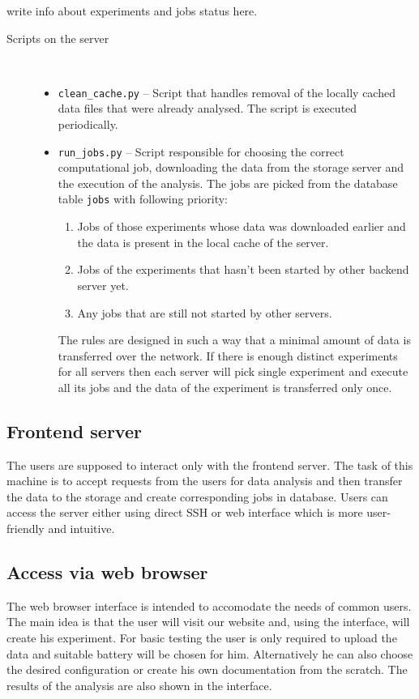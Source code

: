 \documentclass[
  digital,  	%
  color,		%
  oneside,   	%
  12pt,
  nocover,
  notable,
  nolof,
  nolot,
]{fithesis3}
\newenvironment{titlemize}[1]
{
	\begin{description}
	\item[#1]\
	\begin{itemize}
}
{
	\end{itemize}
 	\end{description}
}
\begin{document}
\begin{huge}
write info about experiments and jobs status here.
\end{huge}

\begin{titlemize}{Scripts on the server}
\item \texttt{clean\_cache.py} -- Script that handles removal of the locally cached data files that were already analysed. The script is executed periodically.
\item \texttt{run\_jobs.py} -- Script responsible for choosing the correct computational job, downloading the data from the storage server and the execution of the analysis. The jobs are picked from the database table \texttt{jobs} with following priority:
\begin{enumerate}
\item Jobs of those experiments whose data was downloaded earlier and the data is present in the local cache of the server.
\item Jobs of the experiments that hasn't been started by other backend server yet.
\item Any jobs that are still not started by other servers.
\end{enumerate}
The rules are designed in such a way that a minimal amount of data is transferred over the network. If there is enough distinct experiments for all servers then each server will pick single experiment and execute all its jobs and the data of the experiment is transferred only once.
\end{titlemize}

\subsection{Frontend server}
The users are supposed to interact only with the frontend server. The task of this machine is to accept requests from the users for data analysis and then transfer the data to the storage and create corresponding jobs in database. Users can access the server either using direct SSH or web interface which is more user-friendly and intuitive.

\subsection{Access via web browser}
The web browser interface is intended to accomodate the needs of common users. The main idea is that the user will visit our website and, using the interface, will create his experiment. For basic testing the user is only required to upload the data and suitable battery will be chosen for him. Alternatively he can also choose the desired configuration or create his own documentation from the scratch. The results of the analysis are also shown in the interface. 
\end{document}
